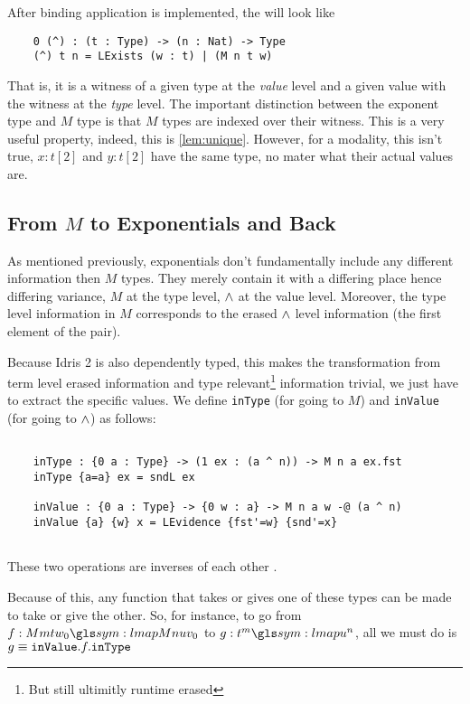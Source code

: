 After binding application \cite{binding_app} is implemented, the will look like
\begin{verbatim}
	0 (^) : (t : Type) -> (n : Nat) -> Type
	(^) t n = LExists (w : t) | (M n t w)
\end{verbatim}

That is, it is a witness of a given type at the \emph{value} level and a given value with the witness at the \emph{type} level.
The important distinction between the exponent type and $M$ type is that $M$ types are indexed over their witness.
This is a very useful property, indeed, this is \ref{lem:unique}. 
However, for a modality, this isn't true, $x : t [2]$ and $y : t [2]$ have the same type, no mater what their actual values are.

\subsection{From $M$ to Exponentials and Back}

As mentioned previously, exponentials don't fundamentally include any different information then $M$ types.
They merely contain it with a differing place hence differing variance, $M$ at the type level, $\wedge$ at the value level.
Moreover, the type level information in $M$ corresponds to the erased $\wedge$ level information (the first element of the pair).

Because Idris 2 is also dependently typed, this makes the transformation from term level erased information and type relevant\footnote{But still ultimitly runtime erased} information trivial, we just have to extract the specific values.
We define \verb|inType| (for going to $M$) and \verb|inValue| (for going to $\wedge$) as follows:

\begin{verbatim}
	
	inType : {0 a : Type} -> (1 ex : (a ^ n)) -> M n a ex.fst
	inType {a=a} ex = sndL ex
	
	inValue : {0 a : Type} -> {0 w : a} -> M n a w -@ (a ^ n)
	inValue {a} {w} x = LEvidence {fst'=w} {snd'=x}
	
\end{verbatim}

These two operations are inverses of each other .

Because of this, any function that takes or gives one of these types can be made to take or give the other.
So, for instance, to go from $f : M m t w_0 \proc M n u v_0$ to $g : t^m \proc u^n$, all we must do is $g \equiv \verb|inValue| . f . \verb|inType|$

